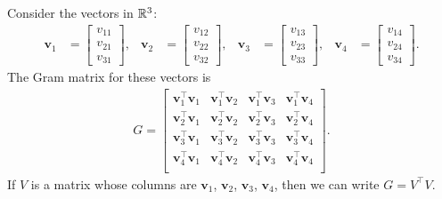 
\def\v{\mathbf{v}}
% 
Consider the vectors in \(\mathbb{R}^3\):
\begin{align*}
    \v_1 &=
    \begin{bmatrix}
        v_{11} \\ v_{21} \\ v_{31}
    \end{bmatrix},&
    \v_2 &=
    \begin{bmatrix}
        v_{12} \\ v_{22} \\ v_{32}
    \end{bmatrix},&
    \v_3 &=
    \begin{bmatrix}
        v_{13} \\ v_{23} \\ v_{33}
    \end{bmatrix},&
    \v_4 &=
    \begin{bmatrix}
        v_{14} \\ v_{24} \\ v_{34}
    \end{bmatrix}.
\end{align*}
The Gram matrix for these vectors is
\begin{align*}
    G = \begin{bmatrix}
        \v_1^\top \v_1 & \v_1^\top \v_2 & \v_1^\top \v_3 & \v_1^\top \v_4\\[3pt]
        \v_2^\top \v_1 & \v_2^\top \v_2 & \v_2^\top \v_3 & \v_2^\top \v_4\\[3pt]
        \v_3^\top \v_1 & \v_3^\top \v_2 & \v_3^\top \v_3 & \v_3^\top \v_4\\[3pt]
        \v_4^\top \v_1 & \v_4^\top \v_2 & \v_4^\top \v_3 & \v_4^\top \v_4\\
    \end{bmatrix}.
\end{align*}
If \(V\) is a matrix whose columns are \(\v_1\), \(\v_2\), \(\v_3\), \(\v_4\), then we can write \(G = V^\top V\).